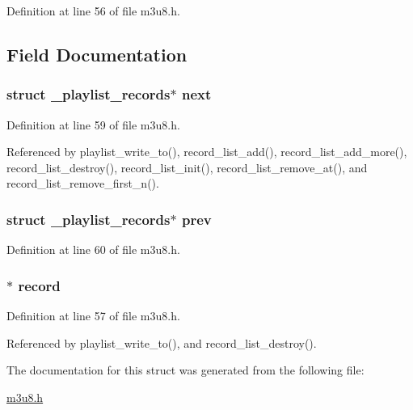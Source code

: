 \-Definition at line 56 of file m3u8.\-h.



\subsection{\-Field \-Documentation}
\hypertarget{struct_playlist_records_afa50efa7cc40de2ed624be01796ecc5a}{
\subsubsection[{next}]{\setlength{\rightskip}{0pt plus 5cm}struct \-\_\-playlist\-\_\-records$\ast$ {\bf next}}}\label{struct_playlist_records_afa50efa7cc40de2ed624be01796ecc5a}


\-Definition at line 59 of file m3u8.\-h.



\-Referenced by playlist\-\_\-write\-\_\-to(), record\-\_\-list\-\_\-add(), record\-\_\-list\-\_\-add\-\_\-more(), record\-\_\-list\-\_\-destroy(), record\-\_\-list\-\_\-init(), record\-\_\-list\-\_\-remove\-\_\-at(), and record\-\_\-list\-\_\-remove\-\_\-first\-\_\-n().

\hypertarget{struct_playlist_records_a44bec84a5d3a4fe698154f605af3d85e}{
\subsubsection[{prev}]{\setlength{\rightskip}{0pt plus 5cm}struct \-\_\-playlist\-\_\-records$\ast$ {\bf prev}}}\label{struct_playlist_records_a44bec84a5d3a4fe698154f605af3d85e}


\-Definition at line 60 of file m3u8.\-h.

\hypertarget{struct_playlist_records_a6d58e7a65bc9b1e859cb3bf645693c58}{
\subsubsection[{record}]{$\ast$ {\bf record}}}\label{struct_playlist_records_a6d58e7a65bc9b1e859cb3bf645693c58}


\-Definition at line 57 of file m3u8.\-h.



\-Referenced by playlist\-\_\-write\-\_\-to(), and record\-\_\-list\-\_\-destroy().



\-The documentation for this struct was generated from the following file\-:\begin{DoxyCompactItemize}
\item 
\hyperlink{m3u8_8h}{m3u8.\-h}\end{DoxyCompactItemize}
